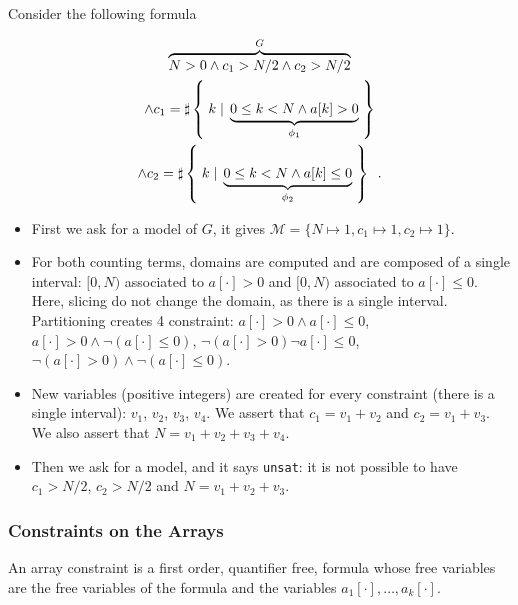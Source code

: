 \begin{example}
Consider the following formula

\begin{multline*}
\overbrace{N > 0 \land c_1 > N/2 \land c_2 > N/2}^G \\
\land c_1 = \sharp\left\lbrace\;k\;|\;\underbrace{0 \le k < N \land a[k] > 0}_{\phi_1}\;\right\rbrace \\
\land c_2 = \sharp\left\lbrace\;k\;|\;\underbrace{0 \le k < N \land a[k] \leq 0}_{\phi_2}\;\right\rbrace\enspace.
\end{multline*}

\begin{itemize}
\item First we ask \solver for a model of $G$, it gives $\mathcal{M} = \{ N
\mapsto 1, c_1 \mapsto 1, c_2 \mapsto 1 \}$.
\item For both counting terms, domains are computed and are composed of a single
interval: $[0, N)$ associated to $a[\cdot] > 0$ and $[0, N)$ associated to
$a[\cdot] \leq 0$. Here, slicing do not change the domain,
as there is a single interval. Partitioning creates 4 constraint: $a[\cdot] >
0 \land a[\cdot] \leq 0$, $a[\cdot] > 0 \land \lnot (a[\cdot] \leq 0)$,
$\lnot(a[\cdot] > 0) \lnot a[\cdot] \leq 0$, $\lnot (a[\cdot] > 0) \land \lnot
(a[\cdot] \leq 0)$.
\item New variables (positive integers) are created for every constraint (there is a single
interval): $v_1$, $v_2$, $v_3$, $v_4$. We assert
that $c_1 = v_1 + v_2$ and $c_2 = v_1 + v_3$. We also assert that $N = v_1 + v_2
+ v_3 + v_4$.
\item Then we ask \solver for a model, and it says \texttt{unsat}: it is not
possible to have $c_1 > N/2$, $c_2 > N/2$ and $N = v_1 + v_2 + v_3$.
\end{itemize}

\end{example}

\subsubsection{Constraints on the Arrays}

\begin{definition}

An array constraint is a first order, quantifier free, formula whose
free variables are the free variables of the formula and the variables
$a_1[\cdot], \ldots, a_k[\cdot]$.

\label{array}

\end{definition}


